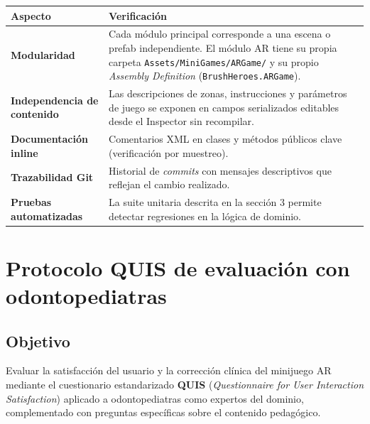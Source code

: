 \documentclass[12pt, a4paper]{article}
\begin{document}
\begin{table}[H]
  \centering
  \renewcommand{\arraystretch}{1.3}
  \begin{tabular}{>{\bfseries}p{4cm} p{8cm}}
    \toprule
    Aspecto & Verificación \\
    \midrule
    Modularidad & Cada módulo principal corresponde a una escena o prefab
                  independiente. El módulo AR tiene su propia carpeta
                  \texttt{Assets/MiniGames/ARGame/} y su propio
                  \textit{Assembly Definition} (\texttt{BrushHeroes.ARGame}). \\
    Independencia de contenido & Las descripciones de zonas, instrucciones
                                  y parámetros de juego se exponen en campos
                                  serializados editables desde el Inspector
                                  sin recompilar. \\
    Documentación inline & Comentarios XML en clases y métodos públicos
                           clave (verificación por muestreo). \\
    Trazabilidad Git & Historial de \textit{commits} con mensajes descriptivos
                       que reflejan el cambio realizado. \\
    Pruebas automatizadas & La suite unitaria descrita en la sección 3
                            permite detectar regresiones en la lógica de dominio. \\
    \bottomrule
  \end{tabular}
\end{table}

\section{Protocolo QUIS de evaluación con odontopediatras}

\subsection{Objetivo}

Evaluar la satisfacción del usuario y la corrección clínica del minijuego AR
mediante el cuestionario estandarizado \textbf{QUIS} (\textit{Questionnaire
for User Interaction Satisfaction}) aplicado a odontopediatras como expertos
del dominio, complementado con preguntas específicas sobre el contenido
pedagógico.
\end{document}
